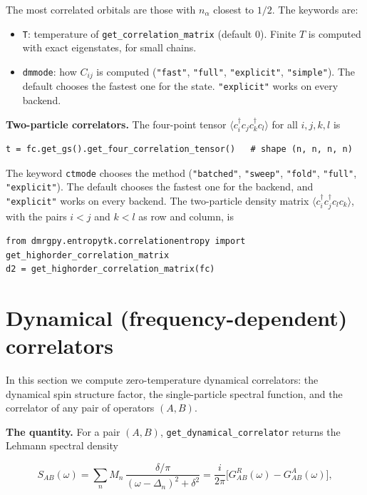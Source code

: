 \documentclass[11pt]{article}
\providecommand{\tightlist}{\setlength{\itemsep}{0pt}\setlength{\parskip}{0pt}}
\begin{document}
The most correlated orbitals are those with \(n_\alpha\) closest to \(1/2\).
The keywords are:

\begin{itemize}
\tightlist
\item
  \texttt{T}: temperature of \texttt{get\_\allowbreak{}correlation\_\allowbreak{}matrix} (default 0). Finite \(T\) is
  computed with exact eigenstates, for small chains.
\item
  \texttt{dmmode}: how \(C_{ij}\) is computed (\texttt{"fast"}, \texttt{"full"}, \texttt{"explicit"},
  \texttt{"simple"}). The default chooses the fastest one for the state.
  \texttt{"explicit"} works on every backend.
\end{itemize}

\textbf{Two-particle correlators.} The four-point tensor
\(\langle c_i^\dagger c_jc_k^\dagger c_l\rangle\) for all \(i,j,k,l\) is

\begin{lstlisting}
t = fc.get_gs().get_four_correlation_tensor()   # shape (n, n, n, n)
\end{lstlisting}

The keyword \texttt{ctmode} chooses the method (\texttt{"batched"}, \texttt{"sweep"}, \texttt{"fold"},
\texttt{"full"}, \texttt{"explicit"}). The default chooses the fastest one for the
backend, and \texttt{"explicit"} works on every backend.
The two-particle density matrix
\(\langle c_i^\dagger c_j^\dagger c_lc_k\rangle\), with the pairs \(i<j\) and
\(k<l\) as row and column, is

\begin{lstlisting}
from dmrgpy.entropytk.correlationentropy import get_highorder_correlation_matrix
d2 = get_highorder_correlation_matrix(fc)
\end{lstlisting}

\section{Dynamical (frequency-dependent) correlators}

In this section we compute zero-temperature dynamical correlators: the
dynamical spin structure factor, the single-particle spectral function, and
the correlator of any pair of operators \((A,B)\).

\textbf{The quantity.} For a pair \((A,B)\), \texttt{get\_\allowbreak{}dynamical\_\allowbreak{}correlator} returns the
Lehmann spectral density

\[S_{AB}(\omega)=\sum_n M_n\,\frac{\delta/\pi}{(\omega-\Delta_n)^2+\delta^2}
=\frac{i}{2\pi}\Big[G^R_{AB}(\omega)-G^A_{AB}(\omega)\Big],\]
\end{document}
